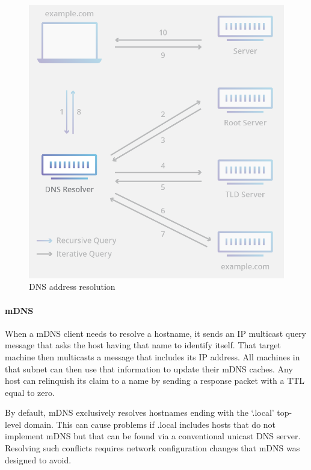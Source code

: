 \begin{figure}
\centering
\includegraphics[width=\textwidth]{images/applications/recursive-resolver.png}
\caption{\acs{DNS} address resolution}
\label{fig:dns}
\end{figure}



\paragraph{\acs{mDNS}}
When a \acl{mDNS} client needs to resolve a hostname, it sends an \acs{IP} multicast query message that asks the host having that name to identify itself.
That target machine then multicasts a message that includes its \acs{IP} address.
All machines in that subnet can then use that information to update their \acs{mDNS} caches.
Any host can relinquish its claim to a name by sending a response packet with a \acf{TTL} equal to zero.

By default, \acs{mDNS} exclusively resolves hostnames ending with the `.local' top-level domain.
This can cause problems if .local includes hosts that do not implement \acs{mDNS} but that can be found via a conventional unicast \acs{DNS} server.
Resolving such conflicts requires network configuration changes that \acs{mDNS} was designed to avoid.


